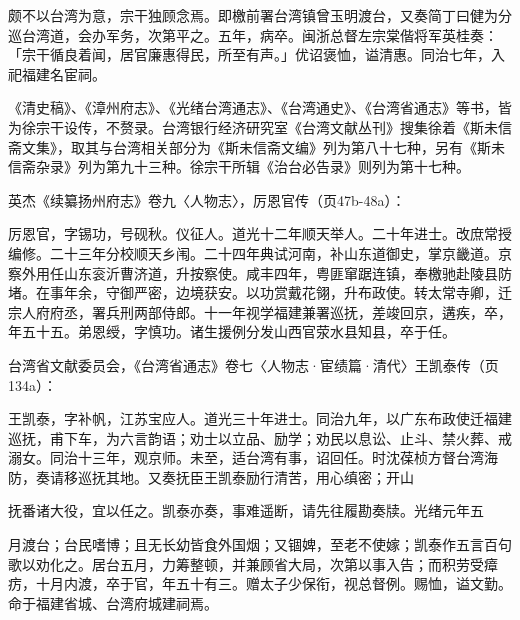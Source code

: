 \begin{BookQuote}
颇不以台湾为意，宗干独顾念焉。即檄前署台湾镇曾玉明渡台，又奏简丁曰健为分巡台湾道，会办军务，次第平之。五年，病卒。闽浙总督左宗棠偕将军英桂奏：「宗干循良着闻，居官廉惠得民，所至有声。」优诏褒恤，谥清惠。同治七年，入祀福建名宦祠。
\end{BookQuote}

《清史稿》、《漳州府志》、《光绪台湾通志》、《台湾通史》、《台湾省通志》等书，皆为徐宗干设传，不赘录。台湾银行经济研究室《台湾文献丛刊》搜集徐着《斯未信斋文集》，取其与台湾相关部分为《斯未信斋文编》列为第八十七种，另有《斯未信斋杂录》列为第九十三种。徐宗干所辑《治台必告录》则列为第十七种。


英杰《续纂扬州府志》卷九〈人物志〉，厉恩官传（页47b-48a）：

\begin{BookQuote}
厉恩官，字锡功，号砚秋。仪征人。道光十二年顺天举人。二十年进士。改庶常授编修。二十三年分校顺天乡闱。二十四年典试河南，补山东道御史，掌京畿道。京察外用任山东衮沂曹济道，升按察使。咸丰四年，粤匪窜踞连镇，奉檄驰赴陵县防堵。在事年余，守御严密，边境获安。以功赏戴花翎，升布政使。转太常寺卿，迁宗人府府丞，署兵刑两部侍郎。十一年视学福建兼署巡抚，差竣回京，遘疾，卒，年五十五。弟恩绶，字慎功。诸生援例分发山西官荥水县知县，卒于任。
\end{BookQuote}


台湾省文献委员会，《台湾省通志》卷七〈人物志·宦绩篇·清代〉王凯泰传（页134a）：

\begin{BookQuote}
王凯泰，字补帆，江苏宝应人。道光三十年进士。同治九年，以广东布政使迁福建巡抚，甫下车，为六言韵语；劝士以立品、励学；劝民以息讼、止斗、禁火葬、戒溺女。同治十三年，观京师。未至，适台湾有事，诏回任。时沈葆桢方督台湾海防，奏请移巡抚其地。又奏抚臣王凯泰励行清苦，用心缜密；开山
\end{BookQuote}

抚番诸大役，宜以任之。凯泰亦奏，事难遥断，请先往履勘奏牍。光绪元年五


\noindent 月渡台；台民嗜博；且无长幼皆食外国烟；又锢婢，至老不使嫁；凯泰作五言百句歌以劝化之。居台五月，力筹整顿，并兼顾省大局，次第以事入告；而积劳受瘴疠，十月内渡，卒于官，年五十有三。赠太子少保衔，视总督例。赐恤，谥文勤。命于福建省城、台湾府城建祠焉。

